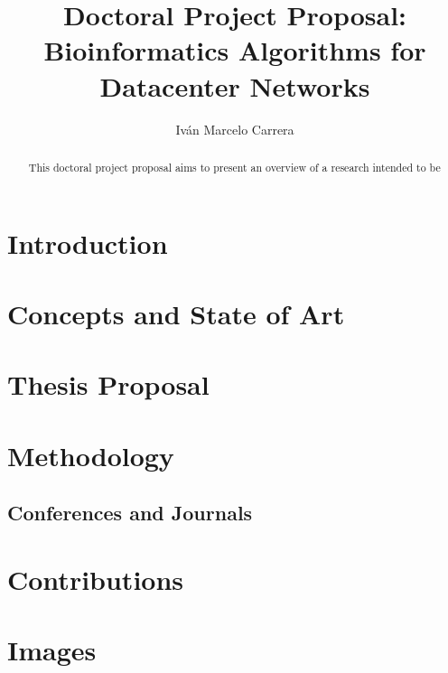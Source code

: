 \documentclass[12pt]{article}
\title{Doctoral Project Proposal: \\Bioinformatics Algorithms for Datacenter Networks}
\author{Iv{\'a}n Marcelo Carrera\inst{1}}
\begin{document}
 

\maketitle

\begin{abstract}


This doctoral project proposal aims to present an overview of a research intended to be
\end{abstract}
     
\section{Introduction}

\section{Concepts and State of Art}

\section{Thesis Proposal}

\section{Methodology}

\subsection{Conferences and Journals}

\section{Contributions}

\section{Images}
\cite{mapreduce-revisited}



\end{document}
